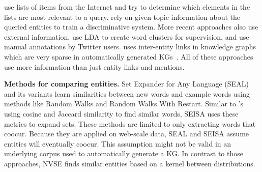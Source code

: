 \documentclass[a4paper]{article}
\newcommand{\nvge}{NVSE\xspace}
\newcommand{\mycite}[1]{\cite{#1}}%
\newcommand{\mynewcite}[1]{\cite{#1}}%
\begin{document}
use lists of items from the Internet and try to
determine which elements in the lists are most relevant to a query. %
\mynewcite{sadamitsu-EtAl:2011:ACL-HLT2011} rely on given topic information about the queried entities
to train a discriminative system. 
More recent approaches also use external information.
\mynewcite{manzil2017deep} use LDA \mycite{blei2003latent} to create
word clusters for supervision,
and \mynewcite{vartak2017meta} use manual annotations by Twitter users.
\mynewcite{zheng2017entity} uses inter-entity links in knowledge graphs which are very sparse in automatically generated KGs~\mycite{pujara2017sparsity,rastogi2017vertex}.
All of these approaches use more information than just entity links and mentions. %

\noindent
{\bf Methods for comparing entities.}
 Set Expander for Any Language (SEAL) \mycite{wang2007language-independent} and its variants \mycite{wang2008iterative,wang2009automatic}
learn similarities between new words %
and example %
words using methods like Random Walks
and Random Walks With Restart.
Similar to \mynewcite{lin1998automatic}'s using cosine and Jaccard similarity to find similar words, %
SEISA uses these metrics to expand sets.
These methods are limited to only extracting %
words that coocur. Because
they are applied on web-scale data, SEAL and SEISA assume entities will eventually coocur.
This assumption might not be valid in an underlying corpus used to automatically generate a KG.
In contrast to those approaches, \nvge finds similar entities based on a kernel between distributions.
\end{document}
